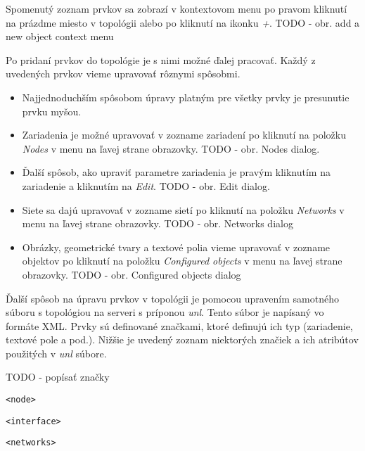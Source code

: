 \begin{enumerate}[noitemsep]
    Spomenutý zoznam prvkov sa zobrazí v kontextovom menu po pravom kliknutí na prázdme miesto v topológii alebo po kliknutí na ikonku \emph{+}. {\huge TODO - obr. add a new object context menu}
    
    \item Po pridaní prvkov do topológie je s nimi možné ďalej pracovať. Každý z uvedených prvkov vieme upravovať rôznymi spôsobmi.
    
    \begin{itemize}[noitemsep]
        \item Najjednoduchším spôsobom úpravy platným pre všetky prvky je presunutie prvku myšou.
        \item Zariadenia je možné upravovať v zozname zariadení po kliknutí na položku \emph{Nodes} v menu na ľavej strane obrazovky. {\huge TODO - obr. Nodes dialog}.
        \item Ďalší spôsob, ako upraviť parametre zariadenia je pravým kliknutím na zariadenie a kliknutím na \emph{Edit}. {\huge TODO - obr. Edit dialog}.
        \item Siete sa dajú upravovať v zozname sietí po kliknutí na položku \emph{Networks} v menu na ľavej strane obrazovky. {\huge TODO - obr. Networks dialog}
        \item Obrázky, geometrické tvary a textové polia vieme upravovať v zozname objektov po kliknutí na položku \emph{Configured objects} v menu na ľavej strane obrazovky. {\huge TODO - obr. Configured objects dialog}
    \end{itemize}
    
Ďalší spôsob na úpravu prvkov v topológii je pomocou upravením samotného súboru s topológiou na serveri s príponou \emph{unl}. Tento súbor je napísaný vo formáte XML. Prvky sú definované značkami, ktoré definujú ich typ (zariadenie, textové pole a pod.). Nižšie je uvedený zoznam niektorých značiek a ich atribútov použitých v \emph{unl} súbore.

{\huge TODO - popísať značky}

    \begin{description}[noitemsep]
        \item \texttt{<node>}
        
        \begin{description}[noitemsep]
            \item \texttt{<interface>}
        \end{description}
        
        \item \texttt{<networks>}
        

\end{description}
\end{enumerate}
